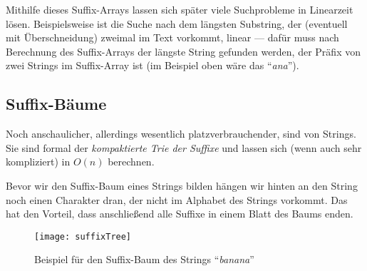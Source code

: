Mithilfe dieses Suffix-Arrays lassen sich später viele Suchprobleme in Linearzeit lösen. Beispielsweise ist die Suche nach dem längsten Substring, der (eventuell mit Überschneidung) zweimal im Text vorkommt, linear --- dafür muss nach Berechnung des Suffix-Arrays der längste String gefunden werden, der Präfix von zwei Strings im Suffix-Array ist (im Beispiel oben wäre das ``\emph{ana}'').

\subsection{Suffix-Bäume}

Noch anschaulicher, allerdings wesentlich platzverbrauchender, sind  von Strings. Sie sind formal der \emph{kompaktierte Trie der Suffixe} und lassen sich (wenn auch sehr kompliziert) in \( O(n) \) berechnen.

\begin{minipage}{.65\textwidth}
  Bevor wir den Suffix-Baum eines Strings bilden hängen wir hinten an den String noch einen Charakter dran, der nicht im Alphabet des Strings vorkommt. Das hat den Vorteil, dass anschließend alle Suffixe in einem Blatt des Baums enden.
\end{minipage}
\hfill
\begin{minipage}{.35\textwidth}
  \begin{figure}[H]
    \texttt{[image: suffixTree]}
    \caption{Beispiel für den Suffix-Baum des Strings ``\emph{banana}''}
  \end{figure}
\end{minipage}